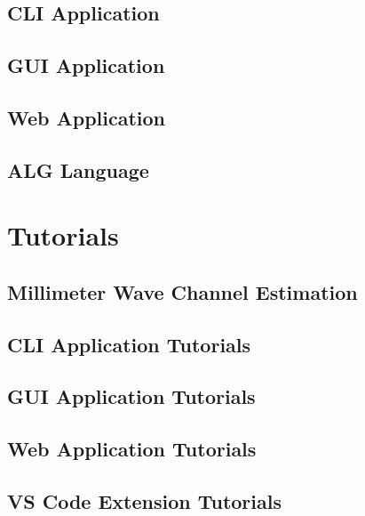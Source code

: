 \documentclass[use boldface]{beaulivre}
\begin{document}
\chapter{CLI Application}


\chapter{GUI Application}


\chapter{Web Application}


\chapter{ALG Language}


\part{Tutorials}

\chapter{Millimeter Wave Channel Estimation}


\chapter{CLI Application Tutorials}
\chapter{GUI Application Tutorials}
\chapter{Web Application Tutorials}
\chapter{VS Code Extension Tutorials}


\appendix

\cleardoublepage
\cleardoublepage
{}
{}
\end{document}

